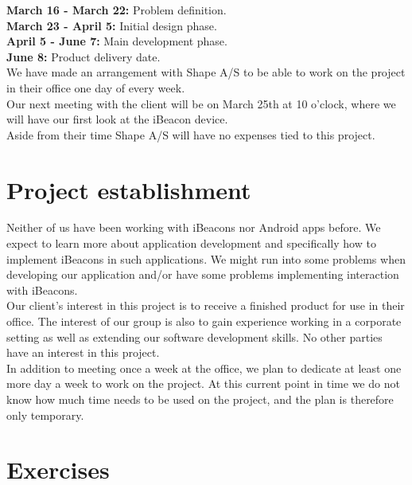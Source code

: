 \documentclass[12pt]{article}
\begin{document}
\textbf{March 16 - March 22:} Problem definition.\\
\textbf{March 23 - April 5:} Initial design phase.\\
\textbf{April 5 - June 7:} Main development phase.\\
\textbf{June 8:} Product delivery date.\\

We have made an arrangement with Shape A/S to be able to work on the project in their office one day of every week.\\

Our next meeting with the client will be on March 25th at 10 o'clock, where we will have our first look at the iBeacon device.\\

Aside from their time Shape A/S will have no expenses tied to this project.










\section{Project establishment}

Neither of us have been working with iBeacons nor Android apps before. We expect to learn more about application development and specifically how to implement iBeacons in such applications. We might run into some problems when developing our application and/or have some problems implementing interaction with iBeacons.\\

Our client's interest in this project is to receive a finished product for use in their office. The interest of our group is also to gain experience working in a corporate setting as well as extending our software development skills. No other parties have an interest in this project.\\

In addition to meeting once a week at the office, we plan to dedicate at least one more day a week to work on the project. At this current point in time we do not know how much time needs to be used on the project, and the plan is therefore only temporary.










\newpage
\section{Exercises}
\end{document}
